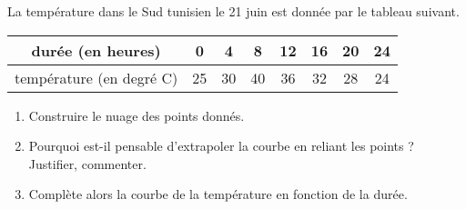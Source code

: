 
La température dans le Sud tunisien le 21 juin est donnée par le tableau suivant.

\begin{tabular}{|c|c|c|c|c|c|c|c|}
\hline 
durée (en heures) & 0 & 4 & 8 & 12 & 16 & 20 & 24\\ 
\hline 
température (en degré C) & 25 & 30 & 40 & 36 & 32 & 28 & 24\\ 
\hline 
\end{tabular} 

\begin{enumerate}
\item Construire le nuage des points donnés.
\item Pourquoi est-il pensable d'extrapoler la courbe en reliant les points ? Justifier, commenter.
\item Complète alors la courbe de la température en fonction de la durée.
\end{enumerate}